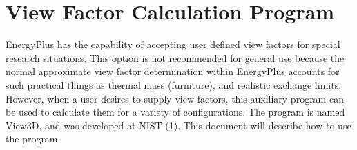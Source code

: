 \chapter{View Factor Calculation Program}\label{view-factor-calculation-program}

EnergyPlus has the capability of accepting user defined view factors for special research situations. This option is not recommended for general use because the normal approximate view factor determination within EnergyPlus accounts for such practical things as thermal mass (furniture), and realistic exchange limits. However, when a user desires to supply view factors, this auxiliary program can be used to calculate them for a variety of configurations. The program is named View3D, and was developed at NIST (1). This document will describe how to use the program.
